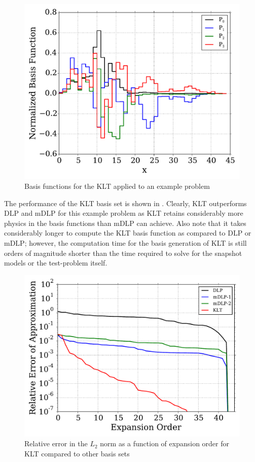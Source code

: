 \begin{figure}[bt]
    \centering
    \includegraphics[trim=.1cm .25cm .1cm .4cm, clip=true,
    totalheight=0.35\textheight]{Figures/KLT_basis}
    \caption{Basis functions for the KLT applied to an example problem}
    \label{fig:KLT_basis}
\end{figure}

The performance of the KLT basis set is shown in .  
Clearly, KLT outperforms DLP and mDLP for this example problem as KLT retains 
considerably more physics in the basis functions than mDLP can achieve.  
Also note 
that it takes considerably longer to compute the KLT basis function as compared 
to DLP or mDLP; however, the computation time for the basis generation of KLT 
is still orders of magnitude shorter than the time required to solve for the 
snapshot models or the test-problem itself.

\begin{figure}[bt]
    \centering
    \includegraphics[trim=.1cm .25cm .1cm .33cm, clip=true,
    totalheight=0.35\textheight]{Figures/KLT_example}
    \caption{Relative error in the $L_2$ norm as a function of expansion order 
for 
KLT 
compared to other basis sets}
    \label{fig:KLT_example}
\end{figure}